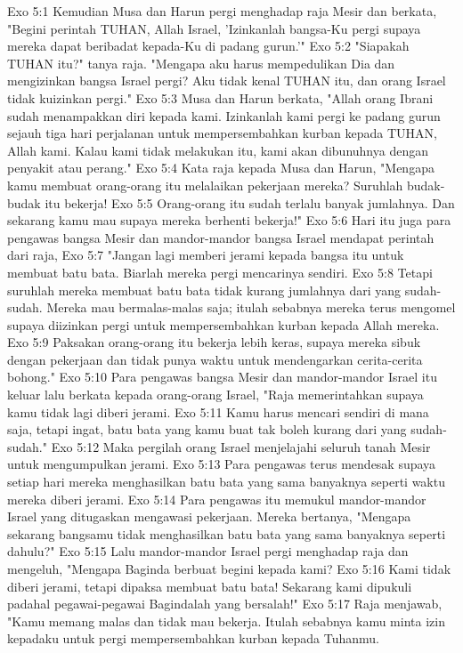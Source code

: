 Exo 5:1  Kemudian Musa dan Harun pergi menghadap raja Mesir dan berkata, "Begini perintah TUHAN, Allah Israel, 'Izinkanlah bangsa-Ku pergi supaya mereka dapat beribadat kepada-Ku di padang gurun.'"
Exo 5:2  "Siapakah TUHAN itu?" tanya raja. "Mengapa aku harus mempedulikan Dia dan mengizinkan bangsa Israel pergi? Aku tidak kenal TUHAN itu, dan orang Israel tidak kuizinkan pergi."
Exo 5:3  Musa dan Harun berkata, "Allah orang Ibrani sudah menampakkan diri kepada kami. Izinkanlah kami pergi ke padang gurun sejauh tiga hari perjalanan untuk mempersembahkan kurban kepada TUHAN, Allah kami. Kalau kami tidak melakukan itu, kami akan dibunuhnya dengan penyakit atau perang."
Exo 5:4  Kata raja kepada Musa dan Harun, "Mengapa kamu membuat orang-orang itu melalaikan pekerjaan mereka? Suruhlah budak-budak itu bekerja!
Exo 5:5  Orang-orang itu sudah terlalu banyak jumlahnya. Dan sekarang kamu mau supaya mereka berhenti bekerja!"
Exo 5:6  Hari itu juga para pengawas bangsa Mesir dan mandor-mandor bangsa Israel mendapat perintah dari raja,
Exo 5:7  "Jangan lagi memberi jerami kepada bangsa itu untuk membuat batu bata. Biarlah mereka pergi mencarinya sendiri.
Exo 5:8  Tetapi suruhlah mereka membuat batu bata tidak kurang jumlahnya dari yang sudah-sudah. Mereka mau bermalas-malas saja; itulah sebabnya mereka terus mengomel supaya diizinkan pergi untuk mempersembahkan kurban kepada Allah mereka.
Exo 5:9  Paksakan orang-orang itu bekerja lebih keras, supaya mereka sibuk dengan pekerjaan dan tidak punya waktu untuk mendengarkan cerita-cerita bohong."
Exo 5:10  Para pengawas bangsa Mesir dan mandor-mandor Israel itu keluar lalu berkata kepada orang-orang Israel, "Raja memerintahkan supaya kamu tidak lagi diberi jerami.
Exo 5:11  Kamu harus mencari sendiri di mana saja, tetapi ingat, batu bata yang kamu buat tak boleh kurang dari yang sudah-sudah."
Exo 5:12  Maka pergilah orang Israel menjelajahi seluruh tanah Mesir untuk mengumpulkan jerami.
Exo 5:13  Para pengawas terus mendesak supaya setiap hari mereka menghasilkan batu bata yang sama banyaknya seperti waktu mereka diberi jerami.
Exo 5:14  Para pengawas itu memukul mandor-mandor Israel yang ditugaskan mengawasi pekerjaan. Mereka bertanya, "Mengapa sekarang bangsamu tidak menghasilkan batu bata yang sama banyaknya seperti dahulu?"
Exo 5:15  Lalu mandor-mandor Israel pergi menghadap raja dan mengeluh, "Mengapa Baginda berbuat begini kepada kami?
Exo 5:16  Kami tidak diberi jerami, tetapi dipaksa membuat batu bata! Sekarang kami dipukuli padahal pegawai-pegawai Bagindalah yang bersalah!"
Exo 5:17  Raja menjawab, "Kamu memang malas dan tidak mau bekerja. Itulah sebabnya kamu minta izin kepadaku untuk pergi mempersembahkan kurban kepada Tuhanmu.
